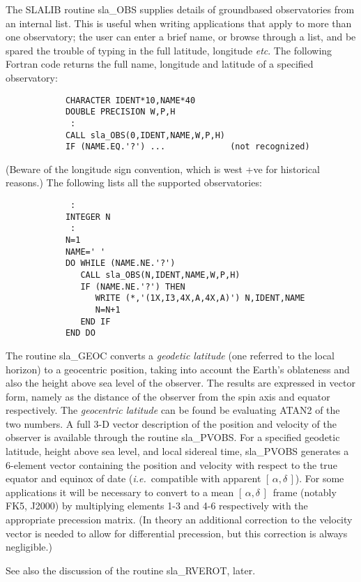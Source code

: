 \documentclass[11pt,twoside]{article}
\newcommand{\radec}     {$[\,\alpha,\delta\,]$}
\begin{document}
The SLALIB routine
sla\_OBS
supplies details of groundbased observatories from an internal
list.  This is useful when writing applications that apply to
more than one observatory;  the user can enter a brief name,
or browse through a list, and be spared the trouble of typing
in the full latitude, longitude {\it etc}.  The following
Fortran code returns the full name, longitude and latitude
of a specified observatory:
\goodbreak
\begin{verbatim}
            CHARACTER IDENT*10,NAME*40
            DOUBLE PRECISION W,P,H
             :
            CALL sla_OBS(0,IDENT,NAME,W,P,H)
            IF (NAME.EQ.'?') ...             (not recognized)
\end{verbatim}
\goodbreak
(Beware of the longitude sign convention, which is west +ve
for historical reasons.)  The following lists all
the supported observatories:
\goodbreak
\begin{verbatim}
             :
            INTEGER N
             :
            N=1
            NAME=' '
            DO WHILE (NAME.NE.'?')
               CALL sla_OBS(N,IDENT,NAME,W,P,H)
               IF (NAME.NE.'?') THEN
                  WRITE (*,'(1X,I3,4X,A,4X,A)') N,IDENT,NAME
                  N=N+1
               END IF
            END DO
\end{verbatim}
\goodbreak
The routine
sla\_GEOC
converts a {\it geodetic latitude}\/
(one referred to the local horizon) to a geocentric position,
taking into account the Earth's oblateness and also the height
above sea level of the observer.  The results are expressed in
vector form, namely as the distance of the observer from
the spin axis and equator respectively.  The {\it geocentric
latitude}\/ can be found be evaluating ATAN2 of the
two numbers.  A full 3-D vector description of the position
and velocity of the observer is available through the routine
sla\_PVOBS.
For a specified geodetic latitude, height above
sea level, and local sidereal time,
sla\_PVOBS
generates a 6-element vector containing the position and
velocity with respect to the true equator and equinox of
date ({\it i.e.}\ compatible with apparent \radec).  For
some applications it will be necessary to convert to a
mean \radec\ frame (notably FK5, J2000) by multiplying
elements 1-3 and 4-6 respectively with the appropriate
precession matrix.  (In theory an additional correction to the
velocity vector is needed to allow for differential precession,
but this correction is always negligible.)

See also the discussion of the routine
sla\_RVEROT,
later.
\end{document}

